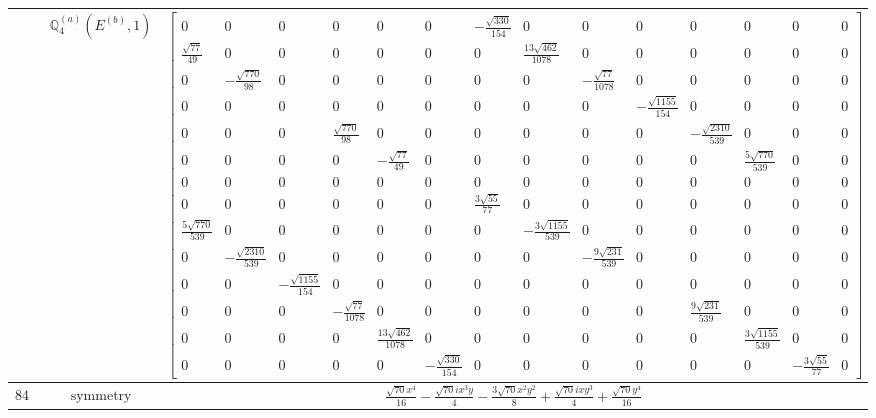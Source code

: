 \documentclass[fleqn,8pt,landscape]{jsarticle}
\begin{document}
\begin{longtable}{ccc}
$  $ & $ \mathbb{Q}_{4}^{(a)}(E^{(b)},1) $ & $ \begin{bmatrix} 0 & 0 & 0 & 0 & 0 & 0 & - \frac{\sqrt{330}}{154} & 0 & 0 & 0 & 0 & 0 & 0 & 0 \\ \frac{\sqrt{77}}{49} & 0 & 0 & 0 & 0 & 0 & 0 & \frac{13 \sqrt{462}}{1078} & 0 & 0 & 0 & 0 & 0 & 0 \\ 0 & - \frac{\sqrt{770}}{98} & 0 & 0 & 0 & 0 & 0 & 0 & - \frac{\sqrt{77}}{1078} & 0 & 0 & 0 & 0 & 0 \\ 0 & 0 & 0 & 0 & 0 & 0 & 0 & 0 & 0 & - \frac{\sqrt{1155}}{154} & 0 & 0 & 0 & 0 \\ 0 & 0 & 0 & \frac{\sqrt{770}}{98} & 0 & 0 & 0 & 0 & 0 & 0 & - \frac{\sqrt{2310}}{539} & 0 & 0 & 0 \\ 0 & 0 & 0 & 0 & - \frac{\sqrt{77}}{49} & 0 & 0 & 0 & 0 & 0 & 0 & \frac{5 \sqrt{770}}{539} & 0 & 0 \\ 0 & 0 & 0 & 0 & 0 & 0 & 0 & 0 & 0 & 0 & 0 & 0 & 0 & 0 \\ 0 & 0 & 0 & 0 & 0 & 0 & \frac{3 \sqrt{55}}{77} & 0 & 0 & 0 & 0 & 0 & 0 & 0 \\ \frac{5 \sqrt{770}}{539} & 0 & 0 & 0 & 0 & 0 & 0 & - \frac{3 \sqrt{1155}}{539} & 0 & 0 & 0 & 0 & 0 & 0 \\ 0 & - \frac{\sqrt{2310}}{539} & 0 & 0 & 0 & 0 & 0 & 0 & - \frac{9 \sqrt{231}}{539} & 0 & 0 & 0 & 0 & 0 \\ 0 & 0 & - \frac{\sqrt{1155}}{154} & 0 & 0 & 0 & 0 & 0 & 0 & 0 & 0 & 0 & 0 & 0 \\ 0 & 0 & 0 & - \frac{\sqrt{77}}{1078} & 0 & 0 & 0 & 0 & 0 & 0 & \frac{9 \sqrt{231}}{539} & 0 & 0 & 0 \\ 0 & 0 & 0 & 0 & \frac{13 \sqrt{462}}{1078} & 0 & 0 & 0 & 0 & 0 & 0 & \frac{3 \sqrt{1155}}{539} & 0 & 0 \\ 0 & 0 & 0 & 0 & 0 & - \frac{\sqrt{330}}{154} & 0 & 0 & 0 & 0 & 0 & 0 & - \frac{3 \sqrt{55}}{77} & 0 \end{bmatrix} $ \\ \hline
$ 842 $ & $ \text{symmetry} $ & $ \frac{\sqrt{70} x^{4}}{16} - \frac{\sqrt{70} i x^{3} y}{4} - \frac{3 \sqrt{70} x^{2} y^{2}}{8} + \frac{\sqrt{70} i x y^{3}}{4} + \frac{\sqrt{70} y^{4}}{16} $ \\

\end{longtable}
\end{document}
